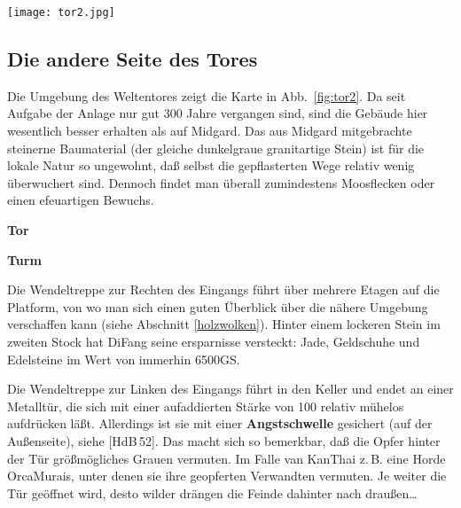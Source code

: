 \documentclass[
a4paper,
twoside,
DIV=calc,
BCOR=4mm,
fontsize=9pt,
twocolumn=on,
titlepage=on,
parskip=half
]{scrartcl}
\begin{document}
\begin{figure*}[t]
  \centering
  \texttt{[image: tor2.jpg]}
  \caption{Die RenSchenYo-Seite des Weltentores}
  \label{fig:tor2}
\end{figure*}

\subsection{Die andere Seite des Tores}

Die Umgebung des Weltentores zeigt die Karte in
Abb.~\ref{fig:tor2}. Da seit Aufgabe der Anlage nur gut 300 Jahre
vergangen sind, sind die Gebäude hier wesentlich besser erhalten als
auf Midgard. Das aus Midgard mitgebrachte steinerne Baumaterial (der
gleiche dunkelgraue granitartige Stein) ist für die lokale Natur so
ungewohnt, daß selbst die gepflasterten Wege relativ wenig überwuchert
sind. Dennoch findet man überall zumindestens Moosflecken oder einen
efeuartigen Bewuchs.

\textbf{ Tor}


\textbf{ Turm}


Die Wendeltreppe zur Rechten des Eingangs führt über mehrere Etagen
auf die Platform, von wo man sich einen guten Überblick über die
nähere Umgebung verschaffen kann (siehe Abschnitt
\ref{holzwolken}). Hinter einem lockeren Stein im zweiten Stock hat
DiFang seine ersparnisse versteckt: Jade, Geldschuhe und Edelsteine im
Wert von immerhin 6500GS.

Die Wendeltreppe zur Linken des Eingangs führt in den Keller und endet
an einer Metalltür, die sich mit einer aufaddierten Stärke von
100 relativ mühelos aufdrücken läßt. Allerdings ist sie mit einer
\textbf{Angstschwelle} gesichert (auf der Außenseite), siehe
[HdB\,52]. Das macht sich so bemerkbar, daß die Opfer hinter der Tür
größmögliches Grauen vermuten. Im Falle van KanThai z.\,B. eine Horde
OrcaMurais, unter denen sie ihre geopferten Verwandten vermuten. Je
weiter die Tür geöffnet wird, desto wilder drängen die Feinde dahinter
nach draußen\dots
\end{document}
